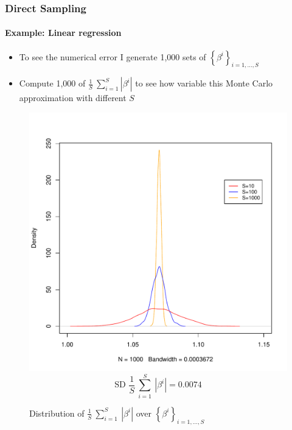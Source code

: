 \documentclass[
  shownotes,
  xcolor={svgnames},
  hyperref={colorlinks,citecolor=DarkBlue,linkcolor=DarkRed,urlcolor=DarkBlue}
  , aspectratio=169]{beamer}
\begin{document}
\begin{frame}[fragile]
\frametitle{Direct Sampling}
\framesubtitle{Example: Linear regression}

\begin{itemize}
\item To see the numerical error I generate 1,000 sets of $\left\{ \beta^{i} \right\}_{i = 1,\ldots,S}$

\item Compute 1,000 of $\frac{1}{S}\ \sum_{i = 1}^{S}\left| \beta^{i} \right|$ to see how variable this Monte Carlo approximation with different $S$

\end{itemize}


  

  \begin{figure}[H] \centering
  \centering
  \caption{Distribution of $\frac{1}{S}\ \sum_{i = 1}^{S}{\ \left| \beta^{i} \right|}$ over $\left\{ \beta^{i} \right\}_{i = 1,\ldots,S}$}
  \includegraphics[scale=0.2]{figures/n1000}
  \\
  \tiny 
  $$\text{SD\ }\frac{1}{S}\ \sum_{i = 1}^{S}{\ \left| \beta^{i} \right|} = 0.0074$$
\end{figure}  




\end{frame}
\end{document}
